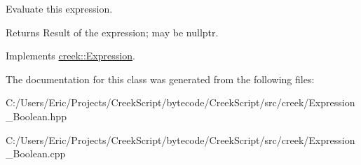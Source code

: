 Evaluate this expression. 

\begin{DoxyReturn}{Returns}
Result of the expression; may be {\ttfamily nullptr}. 
\end{DoxyReturn}


Implements \hyperlink{classcreek_1_1_expression_a3c7fe4a04e24c8d907f918240e2bf43d}{creek\+::\+Expression}.



The documentation for this class was generated from the following files\+:\begin{DoxyCompactItemize}
\item 
C\+:/\+Users/\+Eric/\+Projects/\+Creek\+Script/bytecode/\+Creek\+Script/src/creek/Expression\+\_\+\+Boolean.\+hpp\item 
C\+:/\+Users/\+Eric/\+Projects/\+Creek\+Script/bytecode/\+Creek\+Script/src/creek/Expression\+\_\+\+Boolean.\+cpp\end{DoxyCompactItemize}
